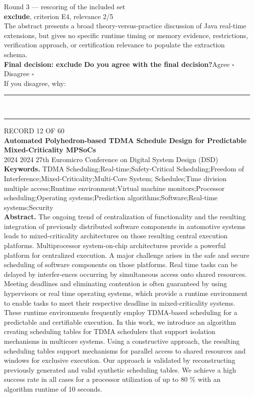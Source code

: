 \documentclass[11pt,a4paper]{article}
\begin{document}
{\footnotesize\color{soft}Round 3 --- rescoring of the included set}\\[0.5mm]
{\small\textbf{exclude}, criterion E4, relevance 2/5}\\[0.5mm]
{\small The abstract presents a broad theory-versus-practice discussion of Java real-time extensions, but gives no specific runtime timing or memory evidence, restrictions, verification approach, or certification relevance to populate the extraction schema.}\\[2.5mm]
{\small\textbf{Final decision: exclude}}
\vspace{2mm}
{\small\textbf{Do you agree with the final decision?}\quad{}Agree $\square$\qquad{}Disagree $\square$}\\[1mm]
{\footnotesize\color{soft}If you disagree, why:}\\[1mm]
\color{rule}\rule{\linewidth}{0.3pt}\\[3mm]\rule{\linewidth}{0.3pt}\color{black}
\clearpage
{\color{soft}\footnotesize RECORD 12 OF 60}\\[1mm]
{\large\bfseries Automated Polyhedron-based TDMA Schedule Design for Predictable Mixed-Criticality MPSoCs}\\[1.5mm]
{\color{soft}\small 2024 \textperiodcentered{} 2024 27th Euromicro Conference on Digital System Design (DSD)}\\[2mm]
{\small\textbf{Keywords.} TDMA Scheduling;Real-time;Safety-Critical Scheduling;Freedom of Interference;Mixed-Criticality;Multi-Core System; Schedules;Time division multiple access;Runtime environment;Virtual machine monitors;Processor scheduling;Operating systems;Prediction algorithms;Software;Real-time systems;Security}\\[2mm]
{\small\textbf{Abstract.} The ongoing trend of centralization of functionality and the resulting integration of previously distributed software components in automotive systems leads to mixed-criticality architectures on those resulting central execution platforms. Multiprocessor system-on-chip architectures provide a powerful platform for centralized execution. A major challenge arises in the safe and secure scheduling of software components on those platforms. Real time tasks can be delayed by interfer-ences occurring by simultaneous access onto shared resources. Meeting deadlines and eliminating contention is often guaranteed by using hypervisors or real time operating systems, which provide a runtime environment to enable tasks to meet their respective deadline in mixed-criticality systems. These runtime environments frequently employ TDMA-based scheduling for a predictable and certifiable execution. In this work, we introduce an algorithm creating scheduling tables for TDMA schedulers that support isolation mechanisms in multicore systems. Using a constructive approach, the resulting scheduling tables support mechanisms for parallel access to shared resources and windows for exclusive execution. Our approach is validated by reconstructing previously generated and valid synthetic scheduling tables. We achieve a high success rate in all cases for a processor utilization of up to 80 \% with an algorithm runtime of 10 seconds.}
\end{document}
